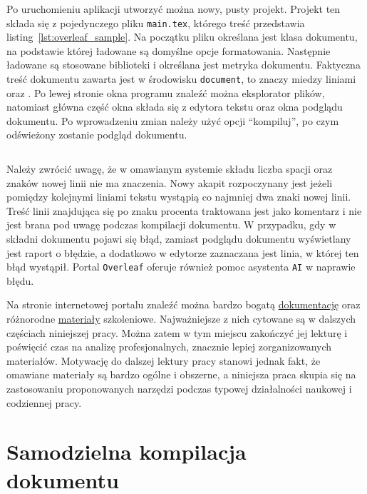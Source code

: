 Po uruchomieniu aplikacji utworzyć można nowy, pusty projekt. Projekt ten składa się z pojedynczego pliku \texttt{main.tex}, którego treść przedstawia listing~\ref{lst:overleaf_sample}. Na początku pliku określana jest klasa dokumentu, na podstawie której ładowane są domyślne opcje formatowania. Następnie ładowane są stosowane biblioteki i określana jest metryka dokumentu. Faktyczna treść dokumentu zawarta jest w środowisku \texttt{document}, to znaczy miedzy liniami \texttt{} oraz \texttt{}. Po lewej stronie okna programu znaleźć można eksplorator plików, natomiast główna część okna składa się z edytora tekstu oraz okna podglądu dokumentu. Po wprowadzeniu zmian należy użyć opcji \enquote{kompiluj}, po czym odświeżony zostanie podgląd dokumentu.

\begin{listing}[htb]
\inputminted{latex}{skrypty/overleaf_sample.tex}
\end{listing}

Należy zwrócić uwagę, że w omawianym systemie składu liczba spacji oraz znaków nowej linii nie ma znaczenia. Nowy akapit rozpoczynany jest jeżeli pomiędzy kolejnymi liniami tekstu wystąpią co najmniej dwa znaki nowej linii. Treść linii znajdująca się po znaku procenta traktowana jest jako komentarz i nie jest brana pod uwagę podczas kompilacji dokumentu. W przypadku, gdy w składni dokumentu pojawi się błąd, zamiast podglądu dokumentu wyświetlany jest raport o błędzie, a dodatkowo w edytorze zaznaczana jest linia, w której ten błąd wystąpił. Portal \texttt{Overleaf} oferuje również pomoc asystenta \texttt{AI} w naprawie błędu.

Na stronie internetowej portalu znaleźć można bardzo bogatą \href{https://www.overleaf.com/learn}{dokumentację} oraz różnorodne \href{https://www.overleaf.com/learn/latex/Learn_LaTeX_in_30_minutes}{materiały} szkoleniowe. Najważniejsze z nich cytowane są w dalszych częściach niniejszej pracy. Można zatem w tym miejscu zakończyć jej lekturę i poświęcić czas na analizę profesjonalnych, znacznie lepiej zorganizowanych materiałów. Motywację do dalszej lektury pracy stanowi jednak fakt, że omawiane materiały są bardzo ogólne i obszerne, a niniejsza praca skupia się na zastosowaniu proponowanych narzędzi podczas typowej działalności naukowej i codziennej pracy.

\section{Samodzielna kompilacja dokumentu}

